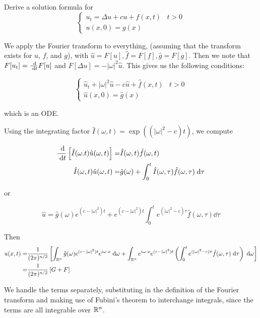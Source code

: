 Derive a solution formula for
$$
\begin{cases}
  u_t = \Delta u + c u + f(x, t) & t > 0\\
  u(x, 0) = g(x)
\end{cases}
$$

We apply the Fourier transform to everything, (assuming that the transform exists for $u$, $f$, and $g$),
with $\hat{u} = F[u], \hat{f} = F[f], \hat{g} = F[g]$.
Then we note that $F[u_t] = \frac{\;\mathrm{d}}{\;\mathrm{d}t} F[u]$ and $F[\Delta u] = -|\omega|^2 \hat{u}$.
This gives us the following conditions:

$$
\begin{cases}
  \hat{u}_t + |\omega|^2 \hat{u} - c \hat{u} + \hat{f}(x, t) & t > 0\\
  \hat{u}(x, 0) = \hat{g}(x)
\end{cases}
$$

which is an ODE.

Using the integrating factor $\hat{I}(\omega, t) = \exp((|\omega|^2 - c)t)$, we compute

\begin{align*}
\frac{\;\mathrm{d}}{\;\mathrm{d}t} \left[ \hat{I}(\omega. t) \hat{u}(\omega, t) \right] =& \hat{I}(\omega, t) \hat{f}(\omega, t)\\
\hat{I}(\omega, t) \hat{u}(\omega, t) =&
\hat{g}(\omega) + \int_0^t \hat{I}(\omega, \tau) \hat{f}(\omega, \tau) \;\mathrm{d}\tau
\end{align*}

or

$$
\hat{u} = \hat{g}(\omega) e^{(c - |\omega|^2) t} + e^{(c - |\omega|^2) t} \int_0^t e^{(|\omega|^2 - c)\tau} \hat{f}(\omega, \tau) \dd{\tau}
$$

Then
\begin{align*}
  u(x, t) = &\frac{1}{(2 \pi)^{n / 2}} \left[ \int_{\mathbb{R}^n} \hat{g}(\omega) e^{(c - |\omega|^2) t} e^{i \omega \cdot x} \;\mathrm{d}\omega
    + \int_{\mathbb{R}^n} e^{i \omega \cdot x} e^{(c - |\omega|^2) t}
        \left( \int_0^t e^{(|\omega|^2 - c)\tau} \hat{f}(\omega, \tau) \;\mathrm{d}\tau \right) \;\mathrm{d}\omega \right]\\
          = &\frac{1}{(2 \pi)^{n / 2}} \left[ G + F \right]
\end{align*}

We handle the terms separately,
substituting in the definition of the Fourier transform and making use of Fubini's theorem to interchange integrals,
since the terms are all integrable over $\mathbb{R}^n$.

